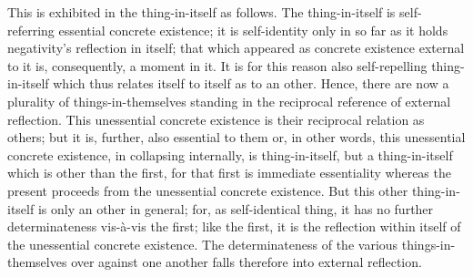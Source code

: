 This is exhibited in the thing-in-itself as follows.
The thing-in-itself is self-referring
essential concrete existence;
it is self-identity only in so far as
it holds negativity's reflection in itself;
that which appeared as concrete existence
external to it is, consequently, a moment in it.
It is for this reason also self-repelling thing-in-itself
which thus relates itself to itself as to an other.
Hence, there are now a plurality of things-in-themselves
standing in the reciprocal reference of external reflection.
This unessential concrete existence is
their reciprocal relation as others;
but it is, further, also essential to them
or, in other words, this unessential concrete existence,
in collapsing internally, is thing-in-itself,
but a thing-in-itself which is other than the first,
for that first is immediate essentiality
whereas the present proceeds from
the unessential concrete existence.
But this other thing-in-itself is only an other in general;
for, as self-identical thing, it has no
further determinateness vis-à-vis the first;
like the first, it is the reflection within itself
of the unessential concrete existence.
The determinateness of the various things-in-themselves
over against one another falls therefore into external reflection.

